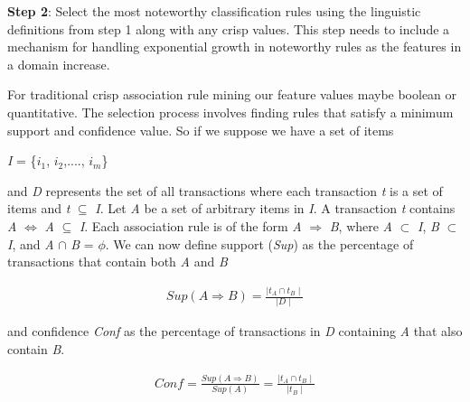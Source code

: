 \noindent
\textbf{Step 2}: Select the most noteworthy classification rules using the linguistic definitions from step 1 along with any crisp values. This step needs to include a mechanism for handling exponential growth in noteworthy rules as the features in a domain increase.

For traditional crisp association rule mining our feature values maybe boolean or quantitative. The selection process involves finding rules that satisfy a minimum support and confidence value. So if we suppose we have a set of items

\textit{I} = \{$i_1$, $i_2$,...., $i_m$\}

\noindent
and \textit{D} represents the set of all transactions where each transaction \textit{t} is a set of items and \textit{t} $\subseteq$ \textit{I}.
Let \textit{A} be a set of arbitrary items in \textit{I}. A transaction \textit{t} contains \textit{A} $\iff$ \textit{A} $\subseteq$ \textit{I}. Each association rule is of the form \textit{A} $\Rightarrow$ \textit{B}, where \textit{A} $\subset$ \textit{I}, \textit{B} $\subset$ \textit{I}, and \textit{A} $\cap$ \textit{B} = $\phi$.
We can now define support (\textit{Sup}) as the percentage of transactions that contain both \textit{A} and \textit{B}


\begin{align}
    \textit{Sup}(\textit{A} \Rightarrow \textit{B}) = \frac{\mid \textit{t}_A \cap \textit{t}_B \mid}{\mid \textit{D} \mid}
\end{align}


\noindent
and confidence \textit{Conf} as the percentage of transactions in \textit{D} containing \textit{A} that also contain \textit{B}.

\begin{align}
    \textit{Conf} = \frac{\textit{Sup}(\textit{A} \Rightarrow \textit{B})}{\textit{Sup}(\textit{A})} = \frac{\mid \textit{t}_A \cap \textit{t}_B \mid}{\mid \textit{t}_B \mid}
\end{align}

